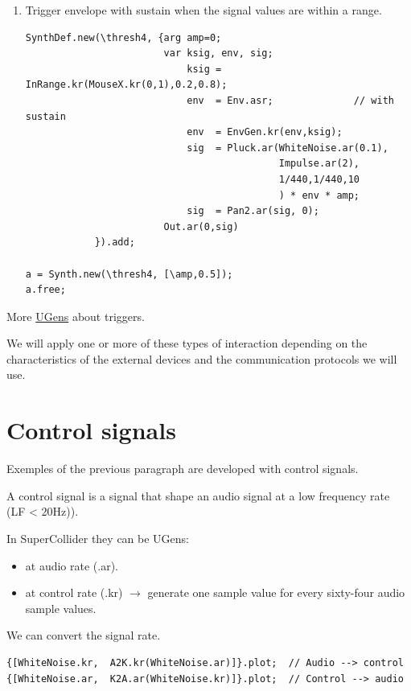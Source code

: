 \begin{enumerate}
\item Trigger envelope with sustain when the signal values are within a range.
\begin{lstlisting}[frame=single] 
SynthDef.new(\thresh4, {arg amp=0;
                        var ksig, env, sig;
                            ksig = InRange.kr(MouseX.kr(0,1),0.2,0.8);
                            env  = Env.asr;              // with sustain
                            env  = EnvGen.kr(env,ksig); 
                            sig  = Pluck.ar(WhiteNoise.ar(0.1),
                                            Impulse.ar(2),
                                            1/440,1/440,10
                                            ) * env * amp;
                            sig  = Pan2.ar(sig, 0); 
                        Out.ar(0,sig)
            }).add;

a = Synth.new(\thresh4, [\amp,0.5]);
a.free;
\end{lstlisting} 
\end{enumerate}

More \href{http://doc.sccode.org/Browse.html#UGens\%3ETriggers}{UGens} about triggers.

We will apply one or more of these types of interaction depending on the characteristics of the external devices and the communication protocols we will use.

\section{Control signals}\label{control-signals}

Exemples of the previous paragraph are developed with control signals.

A control signal is a signal that shape an audio signal at a low frequency rate (LF < 20Hz)).

In SuperCollider they can be UGens:

\begin{itemize}
\tightlist
\item at audio rate (.ar).
\item at control rate (.kr) \(\rightarrow\) generate one sample value for every sixty-four audio sample values.
\end{itemize}

We can convert the signal rate.

\begin{lstlisting}[frame=single] 
{[WhiteNoise.kr,  A2K.kr(WhiteNoise.ar)]}.plot;  // Audio --> control 
{[WhiteNoise.ar,  K2A.ar(WhiteNoise.kr)]}.plot;  // Control --> audio 
\end{lstlisting} 


